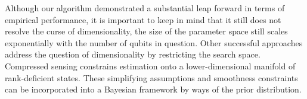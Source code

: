 Although our algorithm demonstrated a substantial leap forward in terms of empirical performance, it is important to keep in mind that it still does not resolve the curse of dimensionality, the size of the parameter space still scales exponentially with the number of qubits in question. Other successful approaches address the question of dimensionality by restricting the search space. Compressed sensing \citep{CompressedSensing} constrains estimation onto a lower-dimensional manifold of rank-deficient states. These simplifying assumptions and smoothness constraints can be incorporated into a Bayesian framework by ways of the prior distribution.